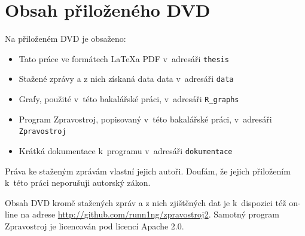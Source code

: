 \documentclass[12pt,a4paper]{report}
\let\openright=\clearpage
\begin{document}
\chapter{Obsah přiloženého DVD}

Na přiloženém DVD je obsaženo:
\begin{itemize}
    \item Tato práce ve formátech \LaTeX a PDF v~adresáři \texttt{thesis}
    \item Stažené zprávy a z nich získaná data data v~adresáři \texttt{data}
    \item Grafy, použité v~této bakalářské práci, v~adresáři \texttt{R\_graphs}
    
    \item Program Zpravostroj, popisovaný v~této bakalářské práci, v~adresáři \texttt{Zpravostroj}
    \item Krátká dokumentace k~programu v~adresáři \texttt{dokumentace}
    
\end{itemize}

Práva ke staženým zprávám vlastní jejich autoři. Doufám, že jejich přiložením k~této práci neporušuji autorský zákon.

Obsah DVD kromě stažených zpráv a z nich zjištěných dat je k~dispozici též on-line na adrese \url{http://github.com/runn1ng/zpravostroj2}. Samotný program Zpravostroj je licencován pod licencí Apache 2.0.


\openright
\end{document}
